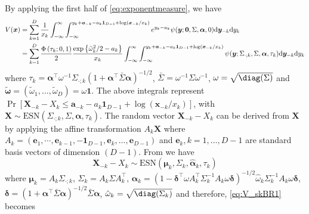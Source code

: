 \documentclass[12pt]{article}
\begin{document}
By applying the first half of \eqref{eq:exponentmeasure}, we have
\begin{align}
\label{eq:V_skBR1}
V(\bm x) &= 
\sum_{k=1}^D \frac{1}{x_k} \int_{-\infty}^\infty \int_{-\infty}^{y_k+\bm a_{-k}-a_k\bm 1_{D-1}+\log(\bm x_{-k}/x_k)} e^{y_k-a_k} \psi(\bm y;\bm 0, \Sigma,\bm \alpha, 0) \text d \bm y_{-k} \text d y_k \nonumber \\
&= \sum_{k=1}^D \frac{\Phi\left(\tau_k; 0, 1\right)}{2} \frac{\exp \left\{\tilde{\omega}_k^2/2-a_k\right\}}{x_k} \int_{-\infty}^\infty\int_{-\infty}^{y_k+ \bm a_{-k}-a_k\bm 1_{D-1}+\log(\bm x_{-k}/x_k)}
\psi(\bm y;\Sigma_{\cdot;k}, \Sigma, \bm \alpha, \tau_k)\text d \bm y_{-k} \text d y_k
\end{align}
where $\tau_k=\bm \alpha^\top\omega^{-1}\Sigma_{\cdot;k} \left(1+\bm\alpha^\top\bar\Sigma \bm\alpha \right)^{-1/2}$, $\bar{\Sigma} = \omega^{-1} \Sigma \omega^{-1}$, $\omega = \sqrt{\diag(\Sigma)}$ and $\tilde{\bm \omega} = \left( \tilde{\omega}_1, \ldots, \tilde{ \omega}_D\right) = \omega \bm 1$. The above integrals represent $\Pr[\bm X_{-k}-X_k\leq \bm a_{-k}-a_{k}\bm 1_{D-1}+\log(\bm x_{-k}/x_k)]$, with $\bm X \sim \text{ESN}(\Sigma_{\cdot;k},\Sigma,\bm \alpha, \tau_k)$. The random vector $\bm X_{-k}-X_k$ can be derived from $\bm X$ by applying the affine transformation $A_k \bm X$ where $A_k = (\bm e_1,\cdots,\bm e_{k-1},-\bm 1_{D-1},\bm e_{k},\ldots,\bm e_{D-1})$ and $\bm e_k, k=1, \ldots, D-1$ are standard basis vectors of dimension $(D-1)$. From \citet[Chapter~5]{Azzalini:2013} we have 
%
$$
\bm X_{-k}-X_k \sim \text{ESN} \left( \bm \mu_k, \Sigma_k, \hat{\bm \alpha}_k, \tau_k\right)
$$
%
where $\bm \mu_k = A_k\Sigma_{\cdot;k}$, 
$\Sigma_k = A_k\Sigma A_k^\top$, 
$\hat{\bm \alpha}_k = (1-\bm\delta^\top \omega A_k^\top\Sigma_k^{-1}A_k\omega\bm\delta)^{-1/2} \hat \omega_k \Sigma_k^{-1}A_k\omega\bm\delta$, 
$\bm \delta = \left( 1 + \bm \alpha^\top \bar{\Sigma} \bm \alpha\right)^{-1/2}\bar{\Sigma} \bm \alpha$, 
$\hat{\omega}_k = \sqrt{\diag(\Sigma_k)}$
and therefore, \eqref{eq:V_skBR1} becomes
%
\end{document}
